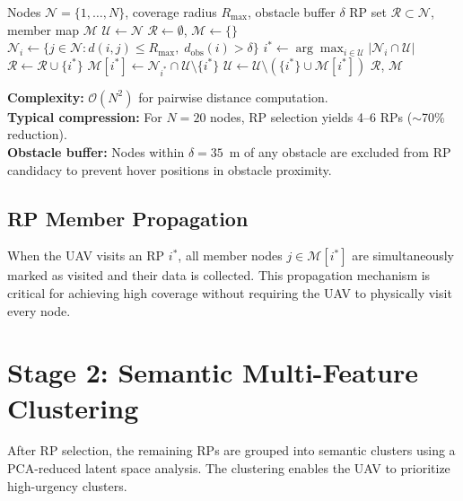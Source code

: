 \documentclass[12pt, a4paper, oneside]{report}
\begin{document}
\begin{algorithm}[htbp]
\caption{Greedy Dominating Set RP Selection}
\label{alg:rp}
\begin{algorithmic}[1]
\Require Nodes $\mathcal{N} = \{1, \ldots, N\}$, coverage radius $R_{\max}$, obstacle buffer $\delta$
\Ensure RP set $\mathcal{R} \subset \mathcal{N}$, member map $\mathcal{M}$
\State $\mathcal{U} \gets \mathcal{N}$ 
\State $\mathcal{R} \gets \emptyset$, $\mathcal{M} \gets \{\}$
    \State $\mathcal{N}_i \gets \{j \in \mathcal{N} : d(i, j) \leq R_{\max}, \; d_{\text{obs}}(i) > \delta\}$
\EndFor
{}
    \State $i^* \gets \arg\max_{i \in \mathcal{U}} |\mathcal{N}_i \cap \mathcal{U}|$ 
    \State $\mathcal{R} \gets \mathcal{R} \cup \{i^*\}$
    \State $\mathcal{M}[i^*] \gets \mathcal{N}_{i^*} \cap \mathcal{U} \setminus \{i^*\}$
    \State $\mathcal{U} \gets \mathcal{U} \setminus (\{i^*\} \cup \mathcal{M}[i^*])$
\EndWhile
\State \Return $\mathcal{R}$, $\mathcal{M}$
\end{algorithmic}
\end{algorithm}

\noindent\textbf{Complexity:} $\mathcal{O}(N^2)$ for pairwise distance computation.\\
\textbf{Typical compression:} For $N = 20$ nodes, RP selection yields 4--6 RPs ($\sim$70\% reduction).\\
\textbf{Obstacle buffer:} Nodes within $\delta = 35$~m of any obstacle are excluded from RP candidacy to prevent hover positions in obstacle proximity.

\subsection{RP Member Propagation}

When the UAV visits an RP $i^*$, all member nodes $j \in \mathcal{M}[i^*]$ are simultaneously marked as visited and their data is collected. This propagation mechanism is critical for achieving high coverage without requiring the UAV to physically visit every node.

\section{Stage 2: Semantic Multi-Feature Clustering}
\label{sec:semantic_clustering}
\label{sec:clustering}

After RP selection, the remaining RPs are grouped into semantic clusters using a PCA-reduced latent space analysis. The clustering enables the UAV to prioritize high-urgency clusters.
\end{document}
